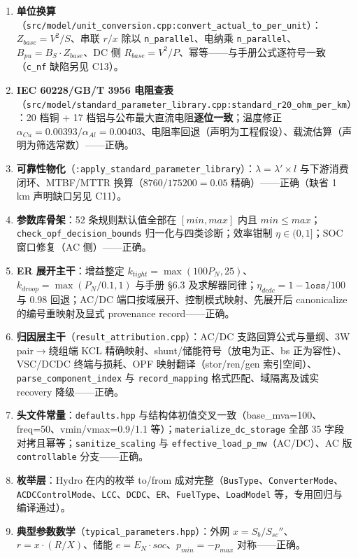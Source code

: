 \documentclass[11pt,a4paper,fontset=fandol]{ctexart}
\newcommand{\file}[1]{\texttt{#1}}
\begin{document}
\begin{enumerate}
  \item \textbf{单位换算}（\file{src/model/unit\_conversion.cpp:convert\_actual\_to\_per\_unit}）：$Z_{base}=V^2/S$、串联 $r/x$ 除以 \texttt{n\_parallel}、电纳乘 \texttt{n\_parallel}、$B_{pu}=B_{S}\cdot Z_{base}$、DC 侧 $R_{base}=V^2/P$、幂等——与手册公式逐符号一致（\texttt{c\_nf} 缺陷另见 C13）。
  \item \textbf{IEC 60228/GB/T 3956 电阻查表}（\file{src/model/standard\_parameter\_library.cpp:standard\_r20\_ohm\_per\_km}）：20 档铜 $+$ 17 档铝与公布最大直流电阻\textbf{逐位一致}；温度修正 $\alpha_{Cu}=0.00393/\alpha_{Al}=0.00403$、电阻率回退（声明为工程假设）、载流估算（声明为筛选常数）——正确。
  \item \textbf{可靠性物化}（\file{:apply\_standard\_parameter\_library}）：$\lambda=\lambda'\times l$ 与下游消费闭环、MTBF/MTTR 换算（$8760/175200=0.05$ 精确）——正确（缺省 1 km 声明缺口另见 C11）。
  \item \textbf{参数库骨架}：52 条规则默认值全部在 $[min,max]$ 内且 $min\le max$；\texttt{check\_opf\_decision\_bounds} 归一化与四类诊断；效率钳制 $\eta\in(0,1]$；SOC 窗口修复（AC 侧）——正确。
  \item \textbf{ER 展开主干}：增益整定 $k_{tight}=\max(100P_N,25)$、$k_{droop}=\max(P_N/0.1,1)$ 与手册 \S 6.3 及求解器同律；$\eta_{dcdc}=1-\texttt{loss}/100$ 与 0.98 回退；AC/DC 端口按域展开、控制模式映射、先展开后 canonicalize 的编号重映射及显式 provenance record——正确。
  \item \textbf{归因层主干}（\file{result\_attribution.cpp}）：AC/DC 支路回算公式与量纲、3W pair$\to$绕组端 KCL 精确映射、shunt/储能符号（放电为正、bs 正为容性）、VSC/DCDC 终端与损耗、OPF 映射翻译（stor/ren/gen 索引空间）、\texttt{parse\_component\_index} 与 \texttt{record\_mapping} 格式匹配、域隔离及诚实 recovery 降级——正确。
  \item \textbf{头文件常量}：\file{defaults.hpp} 与结构体初值交叉一致（base\_mva=100、freq=50、vmin/vmax=0.9/1.1 等）；\file{materialize\_dc\_storage} 全部 35 字段对拷且幂等；\file{sanitize\_scaling} 与 \texttt{effective\_load\_p\_mw}（AC/DC）、AC 版 \texttt{controllable} 分支——正确。
  \item \textbf{枚举层}：Hydro 在内的枚举 to/from 成对完整（\file{BusType}、\file{ConverterMode}、\file{ACDCControlMode}、\file{LCC}、\file{DCDC}、\file{ER}、\file{FuelType}、\file{LoadModel} 等，专用回归与编译通过）。
  \item \textbf{典型参数数学}（\file{typical\_parameters.hpp}）：外网 $x=S_b/S_{sc}''$、$r=x\cdot(R/X)$、储能 $e=E_N\cdot soc$、$p_{min}=-p_{max}$ 对称——正确。
\end{enumerate}
\end{document}
